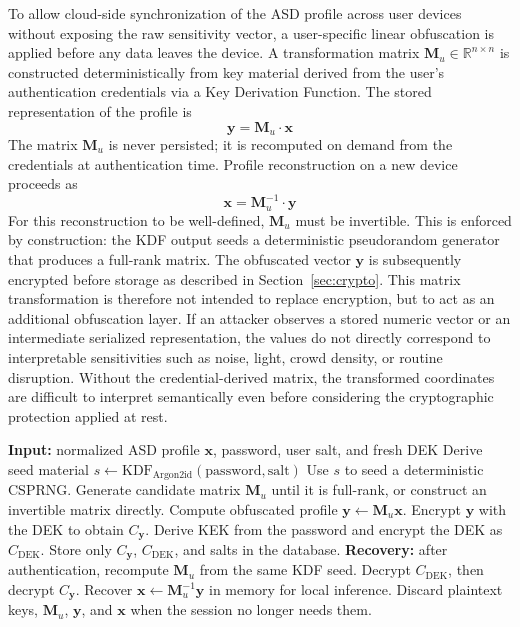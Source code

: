 \documentclass[lettersize,journal]{IEEEtran}
\begin{document}
To allow cloud-side synchronization of the ASD profile across user
devices without exposing the raw sensitivity vector, a user-specific
linear obfuscation is applied before any data leaves the device. A
transformation matrix $\mathbf{M}_u \in \mathbb{R}^{n \times n}$ is
constructed deterministically from key material derived from the user's
authentication credentials via a Key Derivation Function. The stored
representation of the profile is
\begin{equation}
    \mathbf{y} = \mathbf{M}_u \cdot \mathbf{x}
\end{equation}
The matrix $\mathbf{M}_u$ is never persisted; it is recomputed on
demand from the credentials at authentication time. Profile
reconstruction on a new device proceeds as
\begin{equation}
    \mathbf{x} = \mathbf{M}_u^{-1} \cdot \mathbf{y}
\end{equation}
For this reconstruction to be well-defined, $\mathbf{M}_u$ must be
invertible. This is enforced by construction: the KDF output seeds a
deterministic pseudorandom generator that produces a full-rank matrix.
The obfuscated vector $\mathbf{y}$ is subsequently encrypted before
storage as described in Section~\ref{sec:crypto}. This matrix
transformation is therefore not intended to replace encryption, but to
act as an additional obfuscation layer. If an attacker observes a stored
numeric vector or an intermediate serialized representation, the values
do not directly correspond to interpretable sensitivities such as
noise, light, crowd density, or routine disruption. Without the
credential-derived matrix, the transformed coordinates are difficult to
interpret semantically even before considering the cryptographic
protection applied at rest.

\begin{algorithm}[!t]
\caption{Profile matrix obfuscation and recovery}
\label{alg:matrix_obfuscation}
\begin{algorithmic}[1]
\STATE \textbf{Input:} normalized ASD profile $\mathbf{x}$, password,
user salt, and fresh DEK
\STATE Derive seed material
$s \leftarrow \mathrm{KDF}_{\mathrm{Argon2id}}(\mathrm{password},
\mathrm{salt})$
\STATE Use $s$ to seed a deterministic CSPRNG.
\STATE Generate candidate matrix $\mathbf{M}_u$ until it is full-rank,
or construct an invertible matrix directly.
\STATE Compute obfuscated profile $\mathbf{y} \leftarrow
\mathbf{M}_u\mathbf{x}$.
\STATE Encrypt $\mathbf{y}$ with the DEK to obtain $C_{\mathbf{y}}$.
\STATE Derive KEK from the password and encrypt the DEK as
$C_{\mathrm{DEK}}$.
\STATE Store only $C_{\mathbf{y}}$, $C_{\mathrm{DEK}}$, and salts in the
database.
\STATE \textbf{Recovery:} after authentication, recompute
$\mathbf{M}_u$ from the same KDF seed.
\STATE Decrypt $C_{\mathrm{DEK}}$, then decrypt $C_{\mathbf{y}}$.
\STATE Recover $\mathbf{x} \leftarrow \mathbf{M}_u^{-1}\mathbf{y}$ in
memory for local inference.
\STATE Discard plaintext keys, $\mathbf{M}_u$, $\mathbf{y}$, and
$\mathbf{x}$ when the session no longer needs them.
\end{algorithmic}
\end{algorithm}
\end{document}

